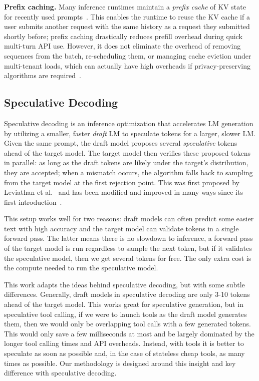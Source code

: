 \vspace{0.08in}
\noindent \textbf{Prefix caching.}
    Many inference runtimes maintain a \emph{prefix cache} of KV state for recently used prompts~\cite{zheng2024sglang, kwon2023efficient}.
    This enables the runtime to reuse the KV cache if a user submits another request with the same history as a request they submitted shortly before; prefix caching drastically reduces prefill overhead during quick multi-turn API use.
    However, it does not eliminate the overhead of removing sequences from the batch, re-scheduling them, or managing cache eviction under multi-tenant loads, which can actually have high overheads if privacy-preserving algorithms are required~\cite{vllm_apc, song2025early}.



\subsection{Speculative Decoding}\label{sec:bg-spec-decoding}
Speculative decoding is an inference optimization that accelerates LM generation by utilizing a smaller, faster \emph{draft} LM to speculate tokens for a larger, slower LM.
Given the same prompt, the draft model proposes several \emph{speculative} tokens ahead of the target model.
The target model then verifies these proposed tokens in parallel: as long as the draft tokens are likely under the target’s distribution, they are accepted; when a mismatch occurs, the algorithm falls back to sampling from the target model at the first rejection point.
This was first proposed by Leviathan et al.~\cite{leviathan_fast_2023} and has been modified and improved in many ways since its first introduction~\cite{hu_speculative_2025}.

This setup works well for two reasons: draft models can often predict some easier text with high accuracy and the target model can validate tokens in a single forward pass.
The latter means there is no slowdown to inference, a forward pass of the target model is run regardless to sample the next token, but if it validates the speculative model, then we get several tokens for free.
The only extra cost is the compute needed to run the speculative model.

This work adapts the ideas behind speculative decoding, but with some subtle differences.
Generally, draft models in speculative decoding are only 3-10 tokens ahead of the target model.
This works great for speculative generation, but in speculative tool calling, if we were to launch tools as the draft model generates them, then we would only be overlapping tool calls with a few generated tokens.
This would only save a few milliseconds at most and be largely dominated by the longer tool calling times and API overheads.
Instead, with tools it is better to speculate as soon as possible and, in the case of stateless cheap tools, as many times as possible.
Our methodology is designed around this insight and key difference with speculative decoding. 
